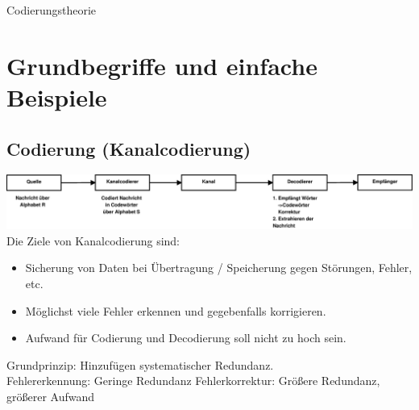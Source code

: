 \newpage
\begin{center}
  \huge{Codierungstheorie}
\end{center}

\section{Grundbegriffe und einfache Beispiele}
	\subsection{Codierung (Kanalcodierung)}
		\includegraphics[width=\textwidth]{eps/pic02.eps}
		Die Ziele von Kanalcodierung sind:
		\begin{itemize}
			\item Sicherung von Daten bei Übertragung / Speicherung gegen Störungen, Fehler, etc.
			\item Möglichst viele Fehler erkennen und gegebenfalls korrigieren.
			\item Aufwand für Codierung und Decodierung soll nicht zu hoch sein.
		\end{itemize}
		Grundprinzip: Hinzufügen systematischer Redundanz.\\
		Fehlererkennung: Geringe Redundanz
		Fehlerkorrektur: Größere Redundanz, größerer Aufwand
	
